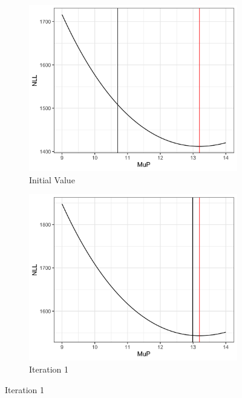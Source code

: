 \documentclass[11pt]{article}
\begin{document}
    \begin{figure}[H]
      \centering
        \begin{subfigure}[b]{0.45\textwidth}
          \includegraphics[width=\textwidth]{../../../output/figures/Optimization/opt_data_1.png}
          \caption{Initial Value}
          \label{fig:f1}
        \end{subfigure}
        \hfill
        \begin{subfigure}[b]{0.45\textwidth}
          \includegraphics[width=\textwidth]{../../../output/figures/Optimization/opt_data_2.png}
          \caption{Iteration 1}


\end{subfigure}
\end{figure}
\end{document}
